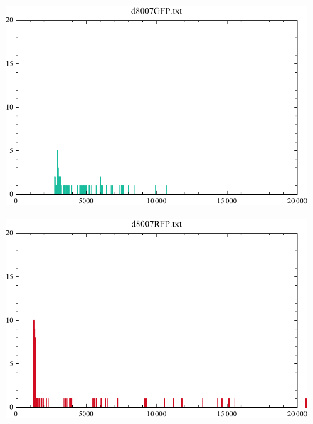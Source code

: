 \documentclass[11pt]{book}
\begin{document}
\begin{figure}[h]
\centering
	\begin{minipage}{.5\textwidth}
  		\centering
  		\includegraphics[width=.9\linewidth]{d8007GFP.pdf}
  		\label{fig:onc1GFPAfterHours}
	\end{minipage}%
	\begin{minipage}{.5\textwidth}
  		\centering
  		\includegraphics[width=.9\linewidth]{d8007RFP.pdf}
  		\label{fig:onc1RFPAfterHours}  
	\end{minipage}
\end{figure}
\end{document}
